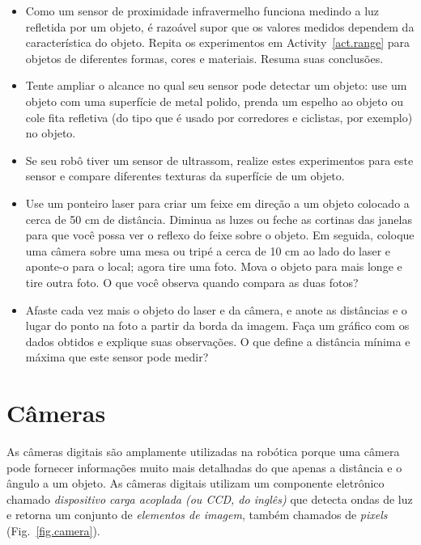 \begin{framed}

\begin{itemize}
\item Como um sensor de proximidade infravermelho funciona medindo a luz refletida por um objeto, é razoável supor que os valores medidos dependem da característica do objeto. Repita os experimentos em Activity~\ref{act.range} para objetos de diferentes formas, cores e materiais. Resuma suas conclusões.
\item Tente ampliar o alcance no qual seu sensor pode detectar um objeto: use um objeto com uma superfície de metal polido, prenda um espelho ao objeto ou cole fita refletiva (do tipo que é usado por corredores e ciclistas, por exemplo) no objeto.
\item Se seu robô tiver um sensor de ultrassom, realize estes experimentos para este sensor e compare diferentes texturas da superfície de um objeto.
\end{itemize}
\end{framed}

\begin{framed}

\begin{itemize}
\item Use um ponteiro laser para criar um feixe em direção a um objeto colocado a cerca de 50 cm de distância. Diminua as luzes ou feche as cortinas das janelas para que você possa ver o reflexo do feixe sobre o objeto. Em seguida, coloque uma câmera sobre uma mesa ou tripé a cerca de 10 cm ao lado do laser e aponte-o para o local; agora tire uma foto. Mova o objeto para mais longe e tire outra foto. O que você observa quando compara as duas fotos?
\item Afaste cada vez mais o objeto do laser e da câmera, e anote as distâncias e o lugar do ponto na foto a partir da borda da imagem. Faça um gráfico com os dados obtidos e explique suas observações. O que define a distância mínima e máxima que este sensor pode medir?
\end{itemize}
\end{framed}

\section{Câmeras}\label{s.cameras}

As câmeras digitais são amplamente utilizadas na robótica porque uma câmera pode fornecer informações muito mais detalhadas do que apenas a distância e o ângulo a um objeto. As câmeras digitais utilizam um componente eletrônico chamado \emph{dispositivo carga acoplada (ou CCD, do inglês)} que detecta ondas de luz e retorna um conjunto de \emph{elementos de imagem}, também chamados de \emph{pixels} (Fig.~\ref{fig.camera}).

